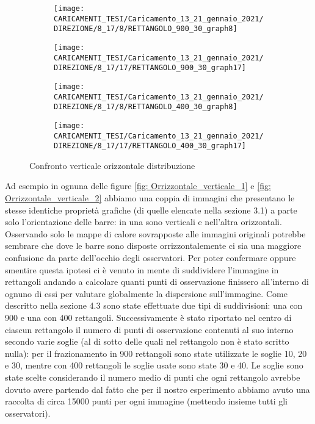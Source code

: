 \documentclass[%
	corpo=12pt,
    twoside,
    stile=classica,
    oldstyle,
    tipotesi=custom,
    greek,
    evenboxes,
]{toptesi}
\begin{document}
{\begin{figure}[!htb]\centering
\begin{subfigure}
\centering
\texttt{[image: CARICAMENTI\_TESI/Caricamento\_13\_21\_gennaio\_2021/DIREZIONE/8\_17/8/RETTANGOLO\_900\_30\_graph8]}
\end{subfigure}
\begin{subfigure}
\centering
\texttt{[image: CARICAMENTI\_TESI/Caricamento\_13\_21\_gennaio\_2021/DIREZIONE/8\_17/17/RETTANGOLO\_900\_30\_graph17]}
\end{subfigure}
\begin{subfigure}
\centering
\texttt{[image: CARICAMENTI\_TESI/Caricamento\_13\_21\_gennaio\_2021/DIREZIONE/8\_17/8/RETTANGOLO\_400\_30\_graph8]}
\end{subfigure}
\begin{subfigure}
\centering
\texttt{[image: CARICAMENTI\_TESI/Caricamento\_13\_21\_gennaio\_2021/DIREZIONE/8\_17/17/RETTANGOLO\_400\_30\_graph17]}
\end{subfigure}
\caption{Confronto verticale orizzontale distribuzione}\label{fig: Orrizzontale_verticale_distribuzione_1}
\end{figure}

 Ad esempio in ognuna delle figure \ref{fig: Orrizzontale_verticale_1} e \ref{fig: Orrizzontale_verticale_2}  abbiamo una coppia di immagini che presentano le stesse identiche proprietà grafiche (di quelle elencate nella sezione 3.1) a parte solo l'orientazione delle barre: in una sono verticali e nell'altra orizzontali. Osservando solo le mappe di calore sovrapposte alle immagini originali potrebbe sembrare che dove le barre sono disposte orrizzontalemente ci sia una maggiore confusione da parte dell'occhio degli osservatori. Per poter confermare oppure smentire questa ipotesi ci è venuto in mente di suddividere l'immagine in rettangoli andando a calcolare quanti punti di osservazione finissero all'interno di ognuno di essi per valutare globalmente la dispersione sull'immagine. Come descritto nella sezione 4.3 sono state effettuate due tipi di suddivisioni: una con 900 e una con 400 rettangoli. Successivamente è stato riportato nel centro di ciascun rettangolo il numero di punti di osservazione contenuti al suo interno secondo varie soglie (al di sotto delle quali nel rettangolo non è stato scritto nulla): per il frazionamento in 900 rettangoli sono state utilizzate le soglie 10, 20 e 30, mentre con 400 rettangoli le soglie usate sono state 30 e 40. Le soglie sono state scelte considerando il numero medio di punti che ogni rettangolo avrebbe dovuto avere partendo dal fatto che per il nostro esperimento abbiamo avuto una raccolta di circa 15000 punti per ogni immagine (mettendo insieme tutti gli osservatori).

}
\end{document}
